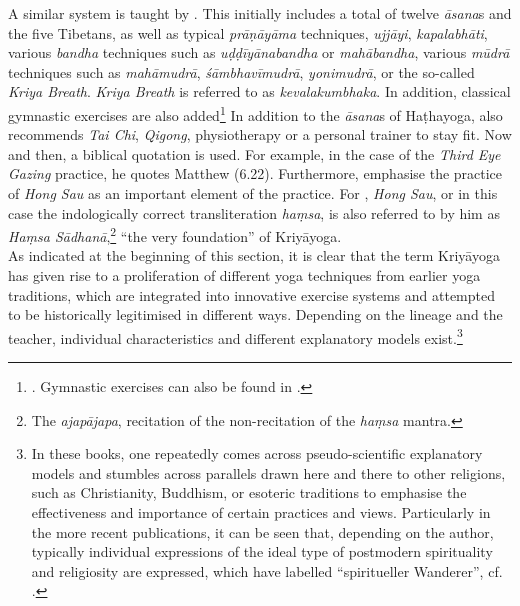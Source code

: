 A similar system is taught by \citeauthor{kriyayogalowenstein}. This initially includes a total of twelve \textit{āsana}s and the five Tibetans, as well as typical \textit{prāṇāyāma} techniques, \textit{ujjāyi}, \textit{kapalabhāti}, various \textit{bandha} techniques such as \textit{uḍḍīyānabandha} or \textit{mahābandha}, various \textit{mūdrā} techniques such as \textit{mahāmudrā}, \textit{śāmbhavīmudrā}, \textit{yonimudrā}, or the so-called \textit{Kriya Breath}. \textit{Kriya Breath} is referred to as \textit{kevalakumbhaka}. In addition, classical gymnastic exercises are also added\footnote{\citeauthor[2021: 118-124]{kriyayogalowenstein}. Gymnastic exercises can also be found in \citeauthor[2015: 447-458]{kriyayogasturgess2015}.} In addition to the \textit{āsana}s of Haṭhayoga, \citeauthor{kriyayogalowenstein} also recommends \textit{Tai Chi}, \textit{Qigong}, physiotherapy or a personal trainer to stay fit. Now and then, a biblical quotation is used. For example, in the case of the \textit{Third Eye Gazing} practice, he quotes Matthew (6.22). Furthermore, \citeauthor{kriyayogalowenstein} emphasise the practice of \textit{Hong Sau} as an important element of the practice. For \citeauthor{kriyayoganityananda2013}, \textit{Hong Sau}, or in this case the indologically correct transliteration \textit{haṃsa}, is also referred to by him as \textit{Haṃsa Sādhanā},\footnote{The \textit{ajapājapa}, recitation of the non-recitation of the \textit{haṃsa} mantra.} ``the very foundation'' of Kriyāyoga.\\

As indicated at the beginning of this section, it is clear that the term Kriyāyoga has given rise to a proliferation of different yoga techniques from earlier yoga traditions, which are integrated into innovative exercise systems and attempted to be historically legitimised in different ways. Depending on the lineage and the teacher, individual characteristics and different explanatory models exist.\footnote{In these books, one repeatedly comes across pseudo-scientific explanatory models and stumbles across parallels drawn here and there to other religions, such as Christianity, Buddhism, or esoteric traditions to emphasise the effectiveness and importance of certain practices and views. Particularly in the more recent publications, it can be seen that, depending on the author, typically individual expressions of the ideal type of postmodern spirituality and religiosity are expressed, which \citeauthor{bochinger2009} have labelled ``spiritueller Wanderer'', cf. \citeauthor[2009: 33-49]{bochinger2009}.}\\

